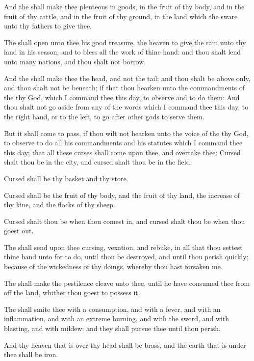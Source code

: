 \Verse And the \LORD shall make thee plenteous in goods, in the fruit of thy body, and in the fruit of thy cattle, and in the fruit of thy ground, in the land which the \LORD sware unto thy fathers to give thee.

\Verse The \LORD shall open unto thee his good treasure, the heaven to give the rain unto thy land in his season, and to bless all the work of thine hand: and thou shalt lend unto many nations, and thou shalt not borrow.

\Verse And the \LORD shall make thee the head, and not the tail; and thou shalt be above only, and thou shalt not be beneath; if that thou hearken unto the commandments of the \LORD thy God, which I command thee this day, to observe and to do them: \Verse And thou shalt not go aside from any of the words which I command thee this day, to the right hand, or to the left, to go after other gods to serve them.

\Verse But it shall come to pass, if thou wilt not hearken unto the voice of the \LORD thy God, to observe to do all his commandments and his statutes which I command thee this day; that all these curses shall come upon thee, and overtake thee: \Verse Cursed shalt thou be in the city, and cursed shalt thou be in the field.

\Verse Cursed shall be thy basket and thy store.

\Verse Cursed shall be the fruit of thy body, and the fruit of thy land, the increase of thy kine, and the flocks of thy sheep.

\Verse Cursed shalt thou be when thou comest in, and cursed shalt thou be when thou goest out.

\Verse The \LORD shall send upon thee cursing, vexation, and rebuke, in all that thou settest thine hand unto for to do, until thou be destroyed, and until thou perish quickly; because of the wickedness of thy doings, whereby thou hast forsaken me.

\Verse The \LORD shall make the pestilence cleave unto thee, until he have consumed thee from off the land, whither thou goest to possess it.

\Verse The \LORD shall smite thee with a consumption, and with a fever, and with an inflammation, and with an extreme burning, and with the sword, and with blasting, and with mildew; and they shall pursue thee until thou perish.

\Verse And thy heaven that is over thy head shall be brass, and the earth that is under thee shall be iron.

